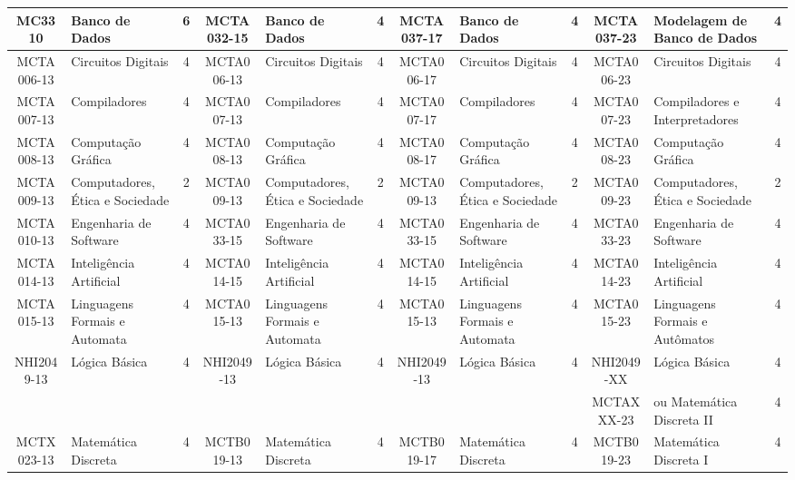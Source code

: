 \begin{landscape}
{\begin{longtable}{|c|p{.2\textheight}|c||c|p{.2\textheight}|c||c|p{.2\textheight}|c||c|p{.2\textheight}|c|}
    MC3310 & Banco de Dados & 6 &
    MCTA032-15 & Banco de Dados & 4 &
    MCTA037-17 & Banco de Dados & 4 &
    MCTA037-23 & Modelagem de Banco de Dados & 4 \\ \hline

    MCTA006-13 & Circuitos Digitais & 4 &
    MCTA006-13 & Circuitos Digitais & 4 &
    MCTA006-17 & Circuitos Digitais & 4 &
    MCTA006-23 & Circuitos Digitais & 4 \\ \hline

    MCTA007-13 & Compiladores & 4 &
    MCTA007-13 & Compiladores & 4 &
    MCTA007-17 & Compiladores & 4 & 
    MCTA007-23 & Compiladores e Interpretadores & 4 \\ \hline

    MCTA008-13 & Computação Gráfica & 4 &
    MCTA008-13 & Computação Gráfica & 4 &
    MCTA008-17 & Computação Gráfica & 4 &
    MCTA008-23 & Computação Gráfica & 4 \\ \hline

    MCTA009-13 & Computadores, Ética e Sociedade & 2 &
    MCTA009-13 & Computadores, Ética e Sociedade & 2 &
    MCTA009-13 & Computadores, Ética e Sociedade & 2 &
    MCTA009-23 & Computadores, Ética e Sociedade & 2 \\ \hline

    MCTA010-13 & Engenharia de Software & 4 &
    MCTA033-15 & Engenharia de Software & 4 & 
    MCTA033-15 & Engenharia de Software & 4 & 
    MCTA033-23 & Engenharia de Software & 4 \\ \hline

    MCTA014-13 & Inteligência Artificial & 4 &
    MCTA014-15 & Inteligência Artificial & 4 & 
    MCTA014-15 & Inteligência Artificial & 4 &
    MCTA014-23 & Inteligência Artificial & 4 \\ \hline

    MCTA015-13 & Linguagens Formais e Automata & 4 &
    MCTA015-13 & Linguagens Formais e Automata & 4 &
    MCTA015-13 & Linguagens Formais e Automata & 4 & 
    MCTA015-23 & Linguagens Formais e Autômatos & 4 \\ \hline

    NHI2049-13 & Lógica Básica & 4 &
    NHI2049-13 & Lógica Básica & 4 &
    NHI2049-13 & Lógica Básica & 4 &
    NHI2049-XX & Lógica Básica & 4 \\

    & & &
    & & &
    & & &
    MCTAXXX-23 & ou Matemática Discreta II & 4 \\ \hline

    MCTX023-13 & Matemática Discreta & 4 & 
    MCTB019-13 & Matemática Discreta & 4 &
    MCTB019-17 & Matemática Discreta & 4 &
    MCTB019-23 & Matemática Discreta I & 4 \\ \hline


\end{longtable}}
\end{landscape}
